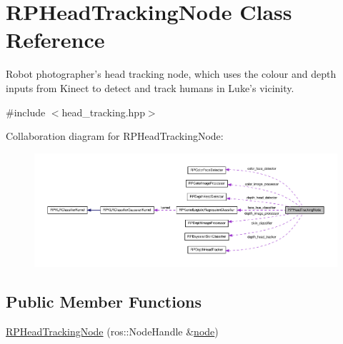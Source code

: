 \hypertarget{class_r_p_head_tracking_node}{\section{\-R\-P\-Head\-Tracking\-Node \-Class \-Reference}
\label{class_r_p_head_tracking_node}
}


\-Robot photographer's head tracking node, which uses the colour and depth inputs from \-Kinect to detect and track humans in \-Luke's vicinity.  




{\ttfamily \#include $<$head\-\_\-tracking.\-hpp$>$}



\-Collaboration diagram for \-R\-P\-Head\-Tracking\-Node\-:\nopagebreak
\begin{figure}[H]
\begin{center}
\leavevmode
\includegraphics[width=350pt]{class_r_p_head_tracking_node__coll__graph}
\end{center}
\end{figure}
\subsection*{\-Public \-Member \-Functions}
\begin{DoxyCompactItemize}
\item 
\hyperlink{class_r_p_head_tracking_node_a08916811b44ea1c237c5ec607a37cc19}{\-R\-P\-Head\-Tracking\-Node} (ros\-::\-Node\-Handle \&\hyperlink{class_r_p_head_tracking_node_a47a74727765d3593c1d235dbd6cc8e34}{node})
\end{DoxyCompactItemize}
